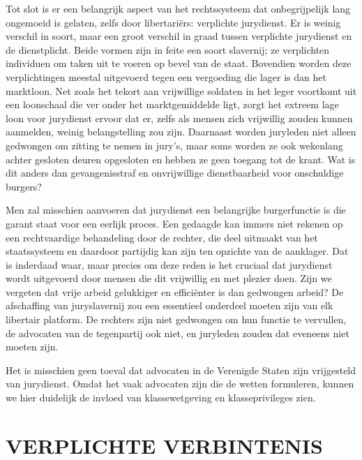 \documentclass[
  a5paper,
  smalldemyvopaper,10pt,twoside,onecolumn,openright,extrafontsizes,hidelinks]{memoir}
\begin{document}
Tot slot is er een belangrijk aspect van het rechtssysteem dat
onbegrijpelijk lang ongemoeid is gelaten, zelfs door libertariërs:
verplichte jurydienst. Er is weinig verschil in soort, maar een groot
verschil in graad tussen verplichte jurydienst en de dienstplicht. Beide
vormen zijn in feite een soort slavernij; ze verplichten individuen om
taken uit te voeren op bevel van de staat. Bovendien worden deze
verplichtingen meestal uitgevoerd tegen een vergoeding die lager is dan
het marktloon. Net zoals het tekort aan vrijwillige soldaten in het
leger voortkomt uit een loonschaal die ver onder het marktgemiddelde
ligt, zorgt het extreem lage loon voor jurydienst ervoor dat er, zelfs
als mensen zich vrijwillig zouden kunnen aanmelden, weinig
belangstelling zou zijn. Daarnaast worden juryleden niet alleen
gedwongen om zitting te nemen in jury's, maar soms worden ze ook
wekenlang achter gesloten deuren opgesloten en hebben ze geen toegang
tot de krant. Wat is dit anders dan gevangenisstraf en onvrijwillige
dienstbaarheid voor onschuldige burgers?

Men zal misschien aanvoeren dat jurydienst een belangrijke burgerfunctie
is die garant staat voor een eerlijk proces. Een gedaagde kan immers
niet rekenen op een rechtvaardige behandeling door de rechter, die deel
uitmaakt van het staatssysteem en daardoor partijdig kan zijn ten
opzichte van de aanklager. Dat is inderdaad waar, maar precies om deze
reden is het cruciaal dat jurydienst wordt uitgevoerd door mensen die
dit vrijwillig en met plezier doen. Zijn we vergeten dat vrije arbeid
gelukkiger en efficiënter is dan gedwongen arbeid? De afschaffing van
juryslavernij zou een essentieel onderdeel moeten zijn van elk libertair
platform. De rechters zijn niet gedwongen om hun functie te vervullen,
de advocaten van de tegenpartij ook niet, en juryleden zouden dat
eveneens niet moeten zijn.

Het is misschien geen toeval dat advocaten in de Verenigde Staten zijn
vrijgesteld van jurydienst. Omdat het vaak advocaten zijn die de wetten
formuleren, kunnen we hier duidelijk de invloed van klassewetgeving en
klasseprivileges zien.

\section{\texorpdfstring{\textbf{VERPLICHTE
VERBINTENIS}}{VERPLICHTE VERBINTENIS}}\label{verplichte-verbintenis}
\end{document}
